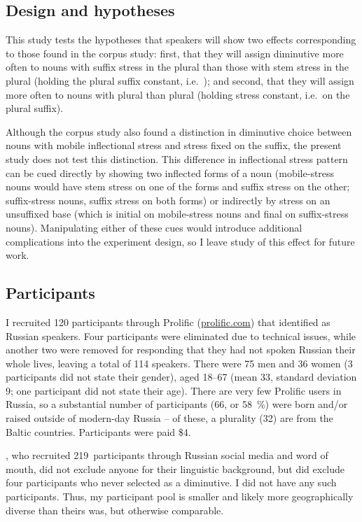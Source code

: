 \documentclass[output=paper,colorlinks,citecolor=brown
]{langscibook}
\begin{document}
\subsection{Design and hypotheses}
This study tests the hypotheses that speakers will show two effects corresponding to those found in the corpus study: first, that they will assign diminutive \ok{} more often to nouns with suffix stress in the plural than those with stem stress in the plural (holding the plural suffix constant, i.e.\ \pli{}); and second, that they will assign \ok{} more often to nouns with plural \pla{} than plural \pli{} (holding stress constant, i.e.\ on the plural suffix).

Although the corpus study also found a distinction in diminutive choice between nouns with mobile inflectional stress and stress fixed on the suffix, the present study does not test this distinction. This difference in inflectional stress pattern can be cued directly by showing two inflected forms of a noun (mobile-stress nouns would have stem stress on one of the forms and suffix stress on the other; suffix-stress nouns, suffix stress on both forms) or indirectly by stress on an unsuffixed base (which is initial on mobile-stress nouns and final on suffix-stress nouns). Manipulating either of these cues would introduce additional complications into the experiment design, so I leave study of this effect for future work.

\subsection{Participants}
I recruited 120 participants through Prolific (\url{prolific.com}) that identified as Russian speakers. Four participants were eliminated due to technical issues, while another two were removed for responding that they had not spoken Russian their whole lives, leaving a total of 114 speakers. There were 75 men and 36 women (3 participants did not state their gender), aged 18--67 (mean $33$, standard deviation $9$; one participant did not state their age). There are very few Prolific users in Russia, so a substantial number of participants (66, or \qty{58}{\percent}) were born and/or raised outside of modern-day Russia -- of these, a plurality (32) are from the Baltic countries. Participants were paid \$4.

\citet{Gouskova.etal2015}, who recruited 219~participants through Russian social media and word of mouth, did not exclude anyone for their linguistic background, but did exclude four participants who never selected \ok{} as a diminutive. I did not have any such participants. Thus, my participant pool is smaller and likely more geographically diverse than theirs was, but otherwise comparable.
\end{document}
